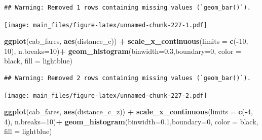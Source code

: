 \documentclass[
]{book}
\newenvironment{Shaded}{\begin{snugshade}}{\end{snugshade}}
\newcommand{\AttributeTok}[1]{\textcolor[rgb]{0.13,0.29,0.53}{#1}}
\newcommand{\DecValTok}[1]{\textcolor[rgb]{0.00,0.00,0.81}{#1}}
\newcommand{\FloatTok}[1]{\textcolor[rgb]{0.00,0.00,0.81}{#1}}
\newcommand{\FunctionTok}[1]{\textcolor[rgb]{0.13,0.29,0.53}{\textbf{#1}}}
\newcommand{\NormalTok}[1]{#1}
\newcommand{\SpecialCharTok}[1]{\textcolor[rgb]{0.81,0.36,0.00}{\textbf{#1}}}
\newcommand{\StringTok}[1]{\textcolor[rgb]{0.31,0.60,0.02}{#1}}
\begin{document}
\begin{verbatim}
## Warning: Removed 1 rows containing missing values (`geom_bar()`).
\end{verbatim}

\texttt{[image: main\_files/figure-latex/unnamed-chunk-227-1.pdf]}

\begin{Shaded}
\begin{Highlighting}[]
\FunctionTok{ggplot}\NormalTok{(cab\_fares, }\FunctionTok{aes}\NormalTok{(distance\_c)) }\SpecialCharTok{+}
        \FunctionTok{scale\_x\_continuous}\NormalTok{(}\AttributeTok{limits =} \FunctionTok{c}\NormalTok{(}\SpecialCharTok{{-}}\DecValTok{10}\NormalTok{, }\DecValTok{10}\NormalTok{), }\AttributeTok{n.breaks=}\DecValTok{10}\NormalTok{)}\SpecialCharTok{+}
        \FunctionTok{geom\_histogram}\NormalTok{(}\AttributeTok{binwidth=}\FloatTok{0.3}\NormalTok{,}\AttributeTok{boundary=}\DecValTok{0}\NormalTok{,}
                       \AttributeTok{color =} \StringTok{\textquotesingle{}black\textquotesingle{}}\NormalTok{,}
                       \AttributeTok{fill =} \StringTok{\textquotesingle{}lightblue\textquotesingle{}}\NormalTok{)}
\end{Highlighting}
\end{Shaded}

\begin{verbatim}
## Warning: Removed 2 rows containing missing values (`geom_bar()`).
\end{verbatim}

\texttt{[image: main\_files/figure-latex/unnamed-chunk-227-2.pdf]}

\begin{Shaded}
\begin{Highlighting}[]
\FunctionTok{ggplot}\NormalTok{(cab\_fares, }\FunctionTok{aes}\NormalTok{(distance\_c\_z)) }\SpecialCharTok{+}
        \FunctionTok{scale\_x\_continuous}\NormalTok{(}\AttributeTok{limits =} \FunctionTok{c}\NormalTok{(}\SpecialCharTok{{-}}\DecValTok{4}\NormalTok{, }\DecValTok{4}\NormalTok{), }\AttributeTok{n.breaks=}\DecValTok{10}\NormalTok{)}\SpecialCharTok{+}
        \FunctionTok{geom\_histogram}\NormalTok{(}\AttributeTok{binwidth=}\FloatTok{0.1}\NormalTok{,}\AttributeTok{boundary=}\DecValTok{0}\NormalTok{,}
                       \AttributeTok{color =} \StringTok{\textquotesingle{}black\textquotesingle{}}\NormalTok{,}
                       \AttributeTok{fill =} \StringTok{\textquotesingle{}lightblue\textquotesingle{}}\NormalTok{)}
\end{Highlighting}
\end{Shaded}
\end{document}
